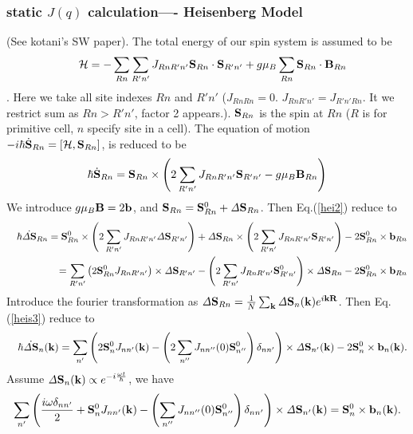 \documentclass[a4paper,10pt,epsf,fleqn]{article}
\newcommand{\bfk}{{\bf k}}
\newcommand{\bfR}{{\bf R}}
\newcommand{\ds}{\displaystyle}
\newcommand{\bfb}{{\bf b}}
\newcommand{\bfS}{{\bf S}}
\newcommand{\bfiS}{{\it \Delta \bf S}}
\newcommand{\bfB}{{\bf B}}
\newcommand{\req}[1]{Eq.(\ref{#1})}
\begin{document}
\subsubsection{static $J(q)$ calculation---- Heisenberg Model}
(See kotani's SW paper).
The total energy of our spin system is assumed to be
\begin{eqnarray}
&& {\cal H} = - \sum_{Rn} \sum_{R'n'} 
J_{Rn R'n'} \bfS_{Rn} \cdot \bfS_{R'n'} + g \mu_B \sum_{Rn} 
\bfS_{Rn} \cdot \bfB_{Rn}
\label{hei1}
\end{eqnarray}
. Here we take all site indexes $Rn$ and $R'n'$ 
($J_{RnRn}=0$. $J_{RnR'n'}=J_{R'n'Rn}$. 
It we restrict sum as $Rn>R'n'$, factor 2 appears.).
$\bfS_{Rn}$ is the spin at $Rn$ ($R$ is for primitive cell, $n$ specify
site in a cell).
The equation of motion 
$-i\hbar \dot{\bfS}_{Rn} = [{\cal H} , {\bfS}_{Rn}]$,
is reduced to be
\begin{eqnarray}
\hbar \dot{\bfS}_{Rn} = \bfS_{Rn} \times 
\left(2 \sum_{R'n'} J_{Rn R'n'} \bfS_{R'n'} - g \mu_B \bfB_{Rn} \right)
\label{hei2}
\end{eqnarray}
We introduce $g \mu_B \bfB = 2 \bfb$, and $\bfS_{Rn}=\bfS_{Rn}^0 + 
\bfiS_{Rn}$. Then \req{hei2} reduce to
\begin{eqnarray}
&&\hbar \dot{\bfiS}_{Rn} =  \bfS^0_{Rn} \times
\left(2 \sum_{R'n'} J_{Rn R'n'} \bfiS_{R'n'}  \right)
+ \bfiS_{Rn} \times 
\left(2 \sum_{R'n'} J_{Rn R'n'} \bfS_{R'n'} \right)
- 2 \bfS^0_{Rn} \times \bfb_{Rn} \nonumber \\
&&= \sum_{R'n'} \left(2 \bfS^0_{Rn} J_{Rn R'n'} \right) \times \bfiS_{R'n'}
- 
\left(2 \sum_{R'n'} J_{Rn R'n'} \bfS^0_{R'n'} \right)  \times \bfiS_{Rn} 
- 2 \bfS^0_{Rn} \times \bfb_{Rn} 
\label{hei3}
\end{eqnarray}
Introduce the fourier transformation as
$\bfiS_{Rn} = \frac{1}{N} \sum_\bfk \bfiS_n(\bfk) e^{i \bfk \bfR}$.
Then \req{heis3} reduce to
\begin{eqnarray}
&&\hbar \dot{\bfiS}_{n}(\bfk)   
= \sum_{n'} \left( 2 \bfS^0_{n} J_{n n'}(\bfk) 
- \left(2 \sum_{n''} J_{n n''}(0) \bfS_{n''}^0\right) \delta_{nn'}\right)  \times \bfiS_{n'}(\bfk)
- 2 \bfS^0_{n} \times \bfb_{n}(\bfk).
\label{hei4}
\end{eqnarray}
Assume $\ds {\bfiS}_{n}(\bfk) \propto e^{-i \frac{\omega t}{\hbar}}$,
we have 
\begin{eqnarray}
 \sum_{n'} \left(\frac{i \omega \delta_{nn'}}{2} +  \bfS^0_{n} J_{n n'}(\bfk) 
- \left( \sum_{n''} J_{n n''}(0) \bfS_{n''}^0\right) \delta_{nn'}\right)  \times \bfiS_{n'}(\bfk)
= \bfS^0_{n} \times \bfb_{n}(\bfk).
\label{hei5}
\end{eqnarray}
\end{document}
